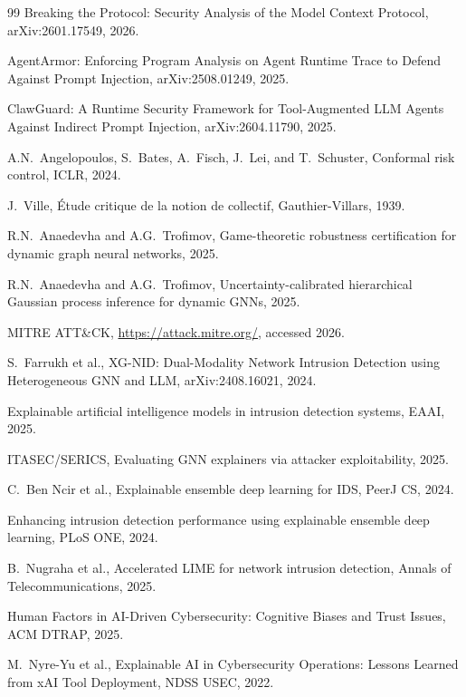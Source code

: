 \documentclass[preprint,review,12pt]{elsarticle}
\begin{document}
\begin{thebibliography}{99}
 Breaking the Protocol: Security Analysis of the Model Context Protocol, arXiv:2601.17549, 2026.

 AgentArmor: Enforcing Program Analysis on Agent Runtime Trace to Defend Against Prompt Injection, arXiv:2508.01249, 2025.

 ClawGuard: A Runtime Security Framework for Tool-Augmented LLM Agents Against Indirect Prompt Injection, arXiv:2604.11790, 2025.

 A.N.~Angelopoulos, S.~Bates, A.~Fisch, J.~Lei, and T.~Schuster, Conformal risk control, ICLR, 2024.

 J.~Ville, \'{E}tude critique de la notion de collectif, Gauthier-Villars, 1939.

 R.N.~Anaedevha and A.G.~Trofimov, Game-theoretic robustness certification for dynamic graph neural networks, 2025.

 R.N.~Anaedevha and A.G.~Trofimov, Uncertainty-calibrated hierarchical Gaussian process inference for dynamic GNNs, 2025.

 MITRE ATT\&CK, \url{https://attack.mitre.org/}, accessed 2026.

 S.~Farrukh et al., XG-NID: Dual-Modality Network Intrusion Detection using Heterogeneous GNN and LLM, arXiv:2408.16021, 2024.

 Explainable artificial intelligence models in intrusion detection systems, EAAI, 2025.

 ITASEC/SERICS, Evaluating GNN explainers via attacker exploitability, 2025.

 C.~Ben Ncir et al., Explainable ensemble deep learning for IDS, PeerJ CS, 2024.

 Enhancing intrusion detection performance using explainable ensemble deep learning, PLoS ONE, 2024.

 B.~Nugraha et al., Accelerated LIME for network intrusion detection, Annals of Telecommunications, 2025.

 Human Factors in AI-Driven Cybersecurity: Cognitive Biases and Trust Issues, ACM DTRAP, 2025.

 M.~Nyre-Yu et al., Explainable AI in Cybersecurity Operations: Lessons Learned from xAI Tool Deployment, NDSS USEC, 2022.


\end{thebibliography}
\end{document}

